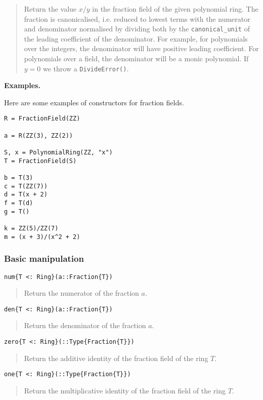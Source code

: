 \documentclass[a4paper,10pt]{article}
\newcommand{\code}{\lstinline}
\newcommand{\desc}[1]{\vspace{-3mm}\begin{quote}#1\end{quote}}
\begin{document}
{{{\desc{Return the value $x/y$ in the fraction field of the given polynomial
ring. The fraction is canonicalised, i.e. reduced to lowest terms with the
numerator and denominator normalised by dividing both by the
\code{canonical_unit} of the leading coefficient of the denominator. For
example, for polynomials over the integers, the denominator will have
positive leading coefficient. For polynomials over a field, the denominator
will be a monic polynomial. If $y = 0$ we throw a \code{DivideError()}.}

\textbf{Examples.}

Here are some examples of constructors for fraction fields.

\begin{lstlisting}
R = FractionField(ZZ)

a = R(ZZ(3), ZZ(2))

S, x = PolynomialRing(ZZ, "x")
T = FractionField(S)

b = T(3)
c = T(ZZ(7))
d = T(x + 2)
f = T(d)
g = T()

k = ZZ(5)/ZZ(7)
m = (x + 3)/(x^2 + 2)
\end{lstlisting}

\subsubsection{Basic manipulation}

\begin{lstlisting}
num{T <: Ring}(a::Fraction{T})
\end{lstlisting}

\desc{Return the numerator of the fraction $a$.}

\begin{lstlisting}
den{T <: Ring}(a::Fraction{T})
\end{lstlisting}

\desc{Return the denominator of the fraction $a$.}

\begin{lstlisting}
zero{T <: Ring}(::Type{Fraction{T}})
\end{lstlisting}

\desc{Return the additive identity of the fraction field of the ring $T$.}

\begin{lstlisting}
one{T <: Ring}(::Type{Fraction{T}})
\end{lstlisting}

\desc{Return the multiplicative identity of the fraction field of the ring 
$T$.}

}}}
\end{document}
